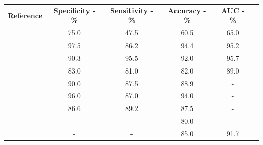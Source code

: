 \documentclass{article}
\begin{document}
\begin{table}[]
    \centering
    \begin{tabular}{cccccc}\toprule
        \multirow{2}{*}{\textbf{Reference}} & \multirow{2}{*}{\textbf{Specificity - \%}} & \multirow{2}{*}{\textbf{Sensitivity - \%}} & \multirow{2}{*}{\textbf{Accuracy - \%}} & \multirow{2}{*}{\textbf{AUC - \%}} \\
        \\\midrule
        \cite{Tu2018}                       & 75.0                                       & 47.5                                       & 60.5                                    & 65.0                               \\
        \cite{Yi20181}                      & 97.5                                       & 86.2                                       & 94.4                                    & 95.2                               \\
        \cite{Yi2018}                       & 90.3                                       & 95.5                                       & 92.0                                    & 95.7                               \\
        \cite{Elmohr2019}                   & 83.0                                       & 81.0                                       & 82.0                                    & 89.0                               \\
        \cite{Torresan2021}                 & 90.0                                       & 87.5                                       & 88.9                                    & -                                  \\
        \cite{Kusunoki2022}                 & 96.0                                       & 87.0                                       & 94.0                                    & -                                  \\
        \cite{Liu2022}                      & 86.6                                       & 89.2                                       & 87.5                                    & -                                  \\
        \cite{Ho2019}                       & -                                          & -                                          & 80.0                                    & -                                  \\
        \cite{Liu2021}                      & -                                          & -                                          & 85.0                                    & 91.7                               \\

\end{tabular}
\end{table}
\end{document}
